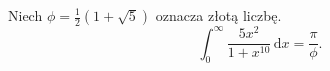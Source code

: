 %

\begin{problem}[pytanie 1653979]
    \label{stack_1653979}%
    Niech $\phi = \frac 1 2 (1 + \sqrt 5)$ oznacza złotą liczbę.
    \begin{equation}
        \int_0^\infty \frac{5x^2}{1  + x^10} \,\mathrm{d}x = \frac{\pi}{\phi}.
    \end{equation}
\end{problem}

%